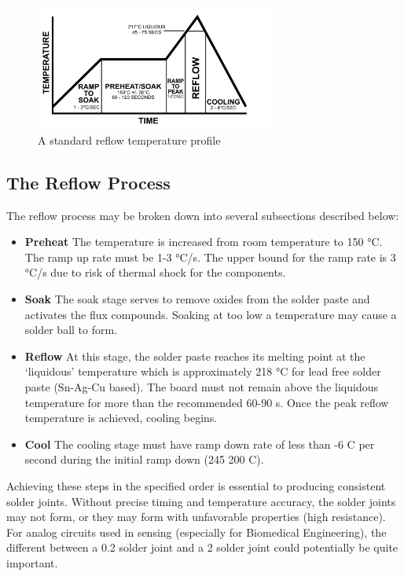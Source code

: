 \documentclass[10pt]{report}
\begin{document}
\begin{figure}[H]
\centering
   \includegraphics[width=0.7\textwidth]{reflow_Curve.jpg}
    \caption{A standard reflow temperature profile}
\end{figure}

\subsection*{The Reflow Process}
\par The reflow process may be broken down into several subsections described below:

\begin{itemize}
\item \textbf{Preheat} The temperature is increased from room temperature to 150 °C. The ramp up rate must be 1-3 °C/s. The upper bound for the ramp rate is 3 °C/s due to risk of thermal shock for the components.

\item \textbf{Soak} The soak stage serves to remove oxides from the solder paste and activates the flux compounds. Soaking at too low a temperature may cause a solder ball to form.

\item \textbf{Reflow} At this stage, the solder paste reaches its melting point at the ‘liquidous’ temperature which is approximately 218 °C for lead free solder paste (Sn-Ag-Cu based). The board must not remain above the liquidous temperature for more than the recommended 60-90 s. Once the peak reflow temperature is achieved, cooling begins.

\item \textbf{Cool} The cooling stage must have  ramp down rate of less than -6 C per second during the initial ramp down (245 200 C).

\end{itemize}

\par Achieving these steps in the specified order is essential to producing consistent solder joints. Without precise timing and temperature accuracy, the solder joints may not form, or they may form with unfavorable properties (high resistance). For analog circuits used in sensing (especially for Biomedical Engineering), the different between a 0.2  solder joint and a 2  solder joint could potentially be quite important. 
\end{document}
